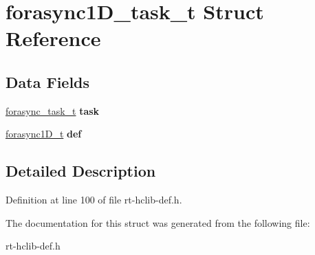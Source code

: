 \hypertarget{structforasync1D__task__t}{\section{forasync1\-D\-\_\-task\-\_\-t Struct Reference}
\label{structforasync1D__task__t}
}
\subsection*{Data Fields}
\begin{DoxyCompactItemize}
\item 
\hypertarget{structforasync1D__task__t_a138fdac62f86224aa268bd75145d1ae5}{\hyperlink{structforasync__task__t}{forasync\-\_\-task\-\_\-t} {\bfseries task}}\label{structforasync1D__task__t_a138fdac62f86224aa268bd75145d1ae5}

\item 
\hypertarget{structforasync1D__task__t_ae87205103530c9659268ff40a48fce59}{\hyperlink{structforasync1D__t}{forasync1\-D\-\_\-t} {\bfseries def}}\label{structforasync1D__task__t_ae87205103530c9659268ff40a48fce59}

\end{DoxyCompactItemize}


\subsection{Detailed Description}


Definition at line 100 of file rt-\/hclib-\/def.\-h.



The documentation for this struct was generated from the following file\-:\begin{DoxyCompactItemize}
\item 
rt-\/hclib-\/def.\-h\end{DoxyCompactItemize}
